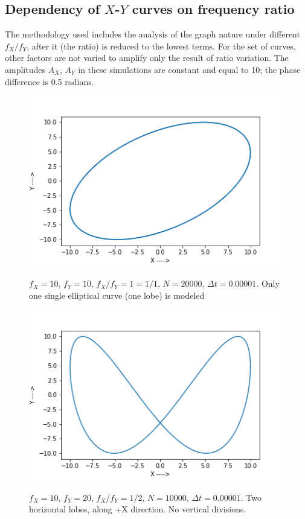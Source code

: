 \documentclass{report}
\begin{document}
\subsection*{Dependency of $X$-$Y$ curves on frequency ratio}
The methodology used includes the analysis of the graph nature under different $f_X/f_Y$, after it (the ratio) is reduced to the lowest terms. For the set of curves, other factors are not varied to amplify only the result of ratio variation. The amplitudes $A_X$, $A_Y$ in these simulations are constant and equal to 10; the phase difference is 0.5 radians.
\begin{figure}[H]
	\centering
	\includegraphics[width = \textwidth]{ratio1.png}
	\label{ratio1}
	\caption{$f_X=10$, $f_Y=10$, $f_X/f_Y=1=1/1$, $N=20000$, $\Delta t=0.00001$.  Only one single elliptical curve (one lobe) is modeled}
	\end{figure}
\begin{figure}[H]
	\centering
	\includegraphics[width = \textwidth]{ratio2.png}
	\label{ratio2}
	\caption{$f_X=10$, $f_Y=20$, $f_X/f_Y=1/2$, $N=10000$, $\Delta t=0.00001$. Two horizontal lobes, along +X direction. No vertical divisions.}
\end{figure}
\end{document}
